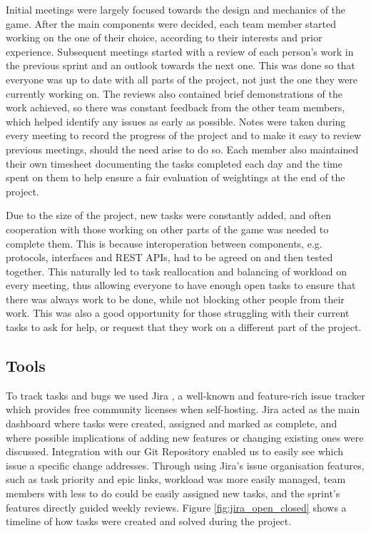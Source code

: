 \documentclass[a4paper,11pt]{article}
\begin{document}
Initial meetings were largely focused towards the design and mechanics of the game. After the main components were decided, each team member started working on the one of their choice, according to their interests and prior experience. Subsequent meetings started with a review of each person’s work in the previous sprint and an outlook towards the next one. This was done so that everyone was up to date with all parts of the project, not just the one they were currently working on. The reviews also contained brief demonstrations of the work achieved, so there was constant feedback from the other team members, which helped identify any issues as early as possible. Notes were taken during every meeting to record the progress of the project and to make it easy to review previous meetings, should the need arise to do so. Each member also maintained their own timesheet documenting the tasks completed each day and the time spent on them to help ensure a fair evaluation of weightings at the end of the project.

Due to the size of the project, new tasks were constantly added, and often cooperation with those working on other parts of the game was needed to complete them. This is because interoperation between components, e.g. protocols, interfaces and REST APIs, had to be agreed on and then tested together. This naturally led to task reallocation and balancing of workload on every meeting, thus allowing everyone to have enough open tasks to ensure that there was always work to be done, while not blocking other people from their work. This was also a good opportunity for those struggling with their current tasks to ask for help, or request that they work on a different part of the project.

\subsection{Tools}

To track tasks and bugs we used Jira \cite{jira}, a well-known and feature-rich issue tracker which provides free community licenses when self-hosting. Jira acted as the main dashboard where tasks were created, assigned and marked as complete, and where possible implications of adding new features or changing existing ones were discussed. Integration with our Git Repository enabled us to easily see which issue a specific change addresses.  Through using Jira’s issue organisation features, such as task priority and epic links, workload was more easily managed, team members with less to do could be easily assigned new tasks, and the sprint’s features directly guided weekly reviews. Figure \ref{fig:jira_open_closed} shows a timeline of how tasks were created and solved during the project.
\end{document}
